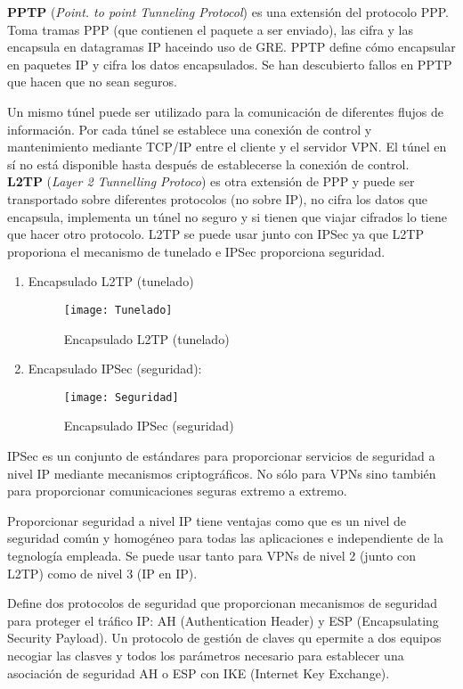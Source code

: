\documentclass[10pt,portrait, twocolumn]{article}
\begin{document}
\textbf{PPTP} (\textit{Point. to point Tunneling Protocol}) es una extensión del protocolo PPP. Toma tramas PPP (que contienen el paquete a ser enviado), las cifra y las encapsula en datagramas IP haceindo uso de GRE. PPTP define cómo encapsular en paquetes IP y cifra los datos encapsulados. Se han descubierto fallos en PPTP que hacen que no sean seguros.

	\quad Un mismo túnel puede ser utilizado para la comunicación de diferentes flujos de información. Por cada túnel se establece una conexión de control y mantenimiento mediante TCP/IP entre el cliente y el servidor VPN. El túnel en sí no está disponible hasta después de establecerse la conexión de control.\\
	
\textbf{L2TP} (\textit{Layer 2 Tunnelling Protoco}) es otra extensión de PPP y puede ser transportado sobre diferentes protocolos (no sobre IP), no cifra los datos que encapsula, implementa un túnel no seguro y si tienen que viajar cifrados lo tiene que hacer otro protocolo. L2TP se puede usar junto con IPSec ya que L2TP proporiona el mecanismo de tunelado e IPSec proporciona seguridad. 

	\begin{enumerate}
	\item Encapsulado L2TP (tunelado)
	\begin{figure}[!ht]	
	\centering
    	\texttt{[image: Tunelado]}
	\caption{Encapsulado L2TP (tunelado)}
	\label{fig:GRE}
	\end{figure} 
	\item Encapsulado IPSec (seguridad):
		\begin{figure}[!ht]	
	\centering
    	\texttt{[image: Seguridad]}
	\caption{Encapsulado IPSec (seguridad)}
	\label{fig:GRE}
	
\end{figure} 
\end{enumerate}
IPSec es un conjunto de estándares para proporcionar servicios de seguridad a nivel IP mediante mecanismos criptográficos. No sólo para VPNs sino también para proporcionar comunicaciones seguras extremo a extremo. 

\quad Proporcionar seguridad a nivel IP tiene ventajas como que es un nivel de seguridad común y homogéneo para todas las aplicaciones e independiente de la tegnología empleada.  Se puede usar tanto para VPNs de nivel 2 (junto con L2TP) como de nivel 3 (IP en IP).

\quad Define dos protocolos de seguridad que proporcionan mecanismos de seguridad para proteger el tráfico IP: AH (Authentication Header) y ESP (Encapsulating Security Payload). Un protocolo de gestión de claves qu epermite a dos equipos necogiar las clasves y todos los parámetros necesario para establecer una asociación de seguridad AH o ESP con IKE (Internet Key Exchange).
\end{document}
